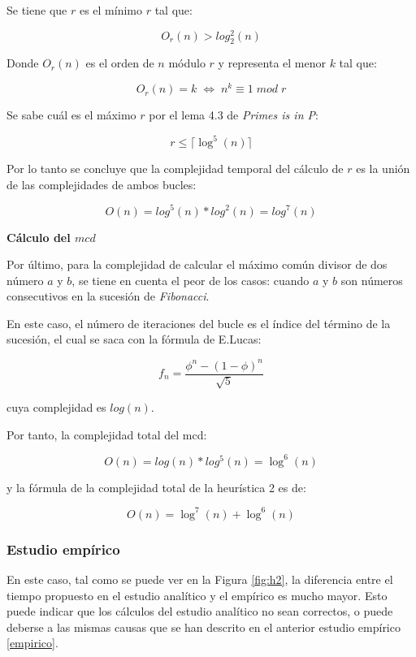 \documentclass{uc3mpracticas}
\begin{document}
\vspace{2mm}

Se tiene que $r$ es el mínimo $r$ tal que:

$$ O_r(n) > log_2^2(n) $$

Donde $O_r(n)$ es el orden de $n$ módulo $r$ y representa el menor $k$ tal que:

$$ O_r(n) = k \; \Leftrightarrow \; n^k \equiv 1 \; mod \; r$$


Se sabe cuál es el máximo $r$ por el lema 4.3 de \textit{Primes is in P}\cite{primesinp}:

$$ r \leq \lceil \log^5(n) \rceil $$

Por lo tanto se concluye que la complejidad temporal del cálculo de $r$ es la unión de las complejidades de ambos bucles:

$$ O(n) = log^5(n) * log^2(n) = log^7(n) $$

\vspace{2mm}

\textbf{Cálculo del $mcd$}

\vspace{2mm}

Por último, para la complejidad de calcular el máximo común divisor de dos número $a$ y $b$, se tiene en cuenta el peor de los casos: cuando $a$ y $b$ son números consecutivos en la sucesión de \textit{Fibonacci}.

\vspace{2mm}

En este caso, el número de iteraciones del bucle es el índice del término de la sucesión, el cual se saca con la fórmula de E.Lucas:

$$ f_n =\frac{\phi^n - (1-\phi)^n}{\sqrt{5}} $$

cuya complejidad es $ log(n) $.

\vspace{2mm}


Por tanto, la complejidad total del mcd:

$$ O(n) = log(n) * log^5(n) = \log^6(n) $$

y la fórmula de la complejidad total de la heurística 2 es de:

$$ O(n) = \log^7(n) + \log^6(n)$$




\subsubsection{Estudio empírico}

En este caso, tal como se puede ver en la Figura \ref{fig:h2}, la diferencia entre el tiempo propuesto en el estudio analítico y el empírico es mucho mayor. Esto puede indicar que los cálculos del estudio analítico no sean correctos, o puede deberse a las mismas causas que se han descrito en el anterior estudio empírico \ref{empirico}.
\end{document}
